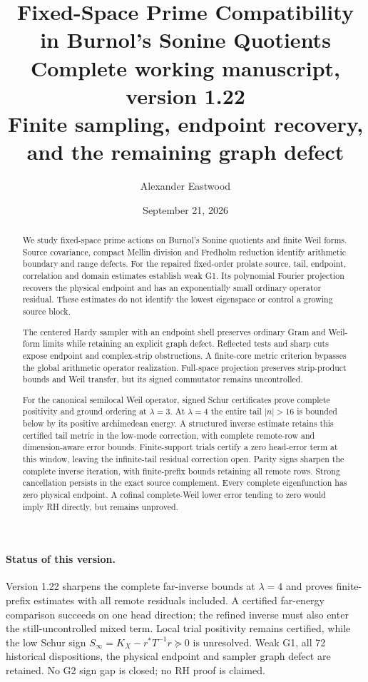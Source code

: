\documentclass[11pt]{article}
\title{\textbf{Fixed-Space Prime Compatibility in Burnol's Sonine Quotients}\\[5pt]
\large Complete working manuscript, version 1.22\\
\normalsize Finite sampling, endpoint recovery, and the remaining graph defect}
\author{Alexander Eastwood}
\date{September 21, 2026}
\theoremstyle{remark}
\begin{document}
\maketitle
\begin{abstract}
We study fixed-space prime actions on Burnol's Sonine quotients and
finite Weil forms. Source covariance, compact Mellin division and
Fredholm reduction identify arithmetic boundary and range defects.
For the repaired fixed-order prolate source, tail, endpoint, correlation
and domain estimates establish weak G1. Its polynomial Fourier
projection recovers the physical endpoint and has an exponentially
small ordinary operator residual. These estimates do not identify
the lowest eigenspace or control a growing source block.

The centered Hardy sampler with an endpoint shell preserves ordinary
Gram and Weil-form limits while retaining an explicit graph defect.
Reflected tests and sharp cuts expose endpoint and complex-strip
obstructions. A finite-core metric criterion bypasses the global
arithmetic operator realization. Full-space projection preserves
strip-product bounds and Weil transfer, but its signed commutator
remains uncontrolled.

For the canonical semilocal Weil operator, signed Schur certificates
prove complete positivity and ground ordering at $\lambda=3$.
At $\lambda=4$ the entire tail $|n|>16$ is bounded below by its
positive archimedean energy. A structured inverse estimate retains
this certified tail metric in the low-mode correction, with complete
remote-row and dimension-aware error bounds. Finite-support trials
certify a zero head-error term at this window, leaving the infinite-tail
residual correction open. Parity signs sharpen the complete inverse
iteration, with finite-prefix bounds retaining all remote rows.
Strong cancellation persists in the exact
source complement. Every complete eigenfunction has zero physical
endpoint. A cofinal complete-Weil lower error tending to zero would
imply RH directly, but remains unproved.
\end{abstract}

\paragraph{Status of this version.}
Version 1.22 sharpens the complete far-inverse bounds at $\lambda=4$
and proves finite-prefix estimates with all remote residuals included.
A certified far-energy comparison succeeds on one head direction;
the refined inverse must also enter the still-uncontrolled mixed term.
Local trial positivity remains certified, while the low Schur sign
$S_\infty=K_X-r^*T^{-1}r\succeq0$ is unresolved. Weak G1, all
72 historical dispositions, the physical endpoint and sampler graph
defect are retained. No G2 sign gap is closed; no RH proof is claimed.
\end{document}
